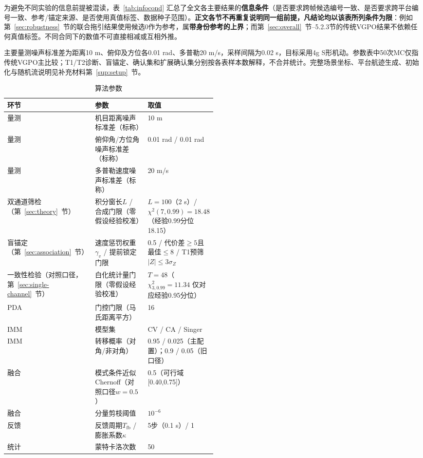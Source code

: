 \documentclass[UTF8,a4paper,zihao=-4]{ctexart}
\begin{document}
为避免不同实验的信息前提被混读，表~\ref{tab:infocond} 汇总了全文各主要结果的\textbf{信息条件}（是否要求跨帧候选编号一致、是否要求跨平台编号一致、参考/锚定来源、是否使用真值标签、数据种子范围）。\textbf{正文各节不再重复说明同一组前提，凡结论均以该表所列条件为限}：例如第~\ref{sec:robustness}~节的联合拖引结果使用候选0作为参考，属\textbf{带身份参考的上界}；而第~\ref{sec:overall}~节--5.2.3节的传统VGPO结果不依赖任何真值标签。不同合同下的数值不可直接相减或互相外推。

主要量测噪声标准差为距离10 m、俯仰及方位各0.01 rad、多普勒20 m/s，采样间隔为0.02 s，目标采用4g S形机动。参数表中50次MC仅指传统VGPO主比较；T1/T2诊断、盲锚定、确认集和扩展确认集分别按各表样本数解释，不合并统计。完整场景坐标、平台航迹生成、初始化与随机流说明见补充材料第~\ref{sup:setup}~节。
\begin{table}[htbp]
\centering
\caption{算法参数}\label{tab:algo}
\begin{tabularx}{0.92\linewidth}{@{}p{0.16\linewidth}p{0.34\linewidth}X@{}}
\toprule
环节 & 参数 & 取值\\
\midrule
量测 & 机目距离噪声标准差（标称） & 10 m\\
量测 & 俯仰角/方位角噪声标准差（标称） & 0.01 rad / 0.01 rad\\
量测 & 多普勒速度噪声标准差（标称） & 20 m/s\\
双通道筛检（第~\ref{sec:theory}~节） & 积分窗长\(L\) / 合成门限（零假设经验校准） & \(L=100\)（2 s）/ \(\chi^2(7,0.99)=18.48\)（经验0.99分位18.15）\\
盲锚定（第~\ref{sec:association}~节） & 速度惩罚权重\(\gamma_v\) / 提前锁定门限 & 0.5 / 代价差\(\ge5\)且最佳\(\le8\) / T1预筛\(|Z|\le3\sigma_Z\)\\\midrule
一致性检验（对照口径，第~\ref{sec:single-channel}~节） & 白化统计量门限（零假设经验校准） & \(T=48\)（\(\chi^2_{3,0.99}=11.34\) 仅对应经验0.95分位）\\
PDA & 门控门限（马氏距离平方） & 16\\
IMM & 模型集 & CV / CA / Singer\\
IMM & 转移概率（对角/非对角） & 0.95 / 0.025（主配置）；0.9 / 0.05（旧口径）\\
融合 & 模式条件近似Chernoff（对照口径\(w=0.5\)） & 0.5（可行域[0.40,0.75]）\\
融合 & 分量剪枝阈值 & \(10^{-6}\)\\
反馈 & 反馈周期\(T_{\mathrm{fb}}\) / 膨胀系数\(\kappa\) & 5步（0.1 s）/ 1\\
统计 & 蒙特卡洛次数 & 50\\
\bottomrule
\end{tabularx}
\par{}
\end{table}
\end{document}
